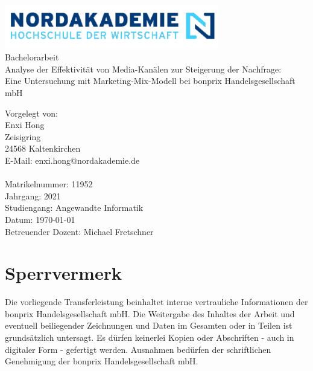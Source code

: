 \documentclass{common/nak}
\numberwithin{equation}{subsection}
\begin{document}
\hspace{3cm}
\begin{center}
    \includegraphics[width=0.7\textwidth]{images/nak_logo2.png}\\
     \huge { Bachelorarbeit \\[1em]
     \large{Analyse der Effektivität von Media-Kanälen zur Steigerung der Nachfrage:
     \\ Eine Untersuchung mit Marketing-Mix-Modell bei bonprix Handelsgesellschaft mbH
}}
\end{center}

\vspace*{\fill}


\noindent Vorgelegt von:\\
Enxi Hong \\
Zeisigring \\
24568 Kaltenkirchen\\
E-Mail: enxi.hong@nordakademie.de\\
\\
Matrikelnummer: 11952\\
Jahrgang: 2021\\
Studiengang: Angewandte Informatik\\
Datum: \today\\
Betreuender Dozent: Michael Fretschner\\

\newpage

\newpage
\section*{Sperrvermerk}

Die vorliegende Transferleistung beinhaltet interne vertrauliche Informationen der bonprix Handelsgesellschaft mbH. Die Weitergabe des Inhaltes der Arbeit und eventuell beiliegender Zeichnungen und Daten im Gesamten oder in Teilen ist grundsätzlich untersagt. Es dürfen keinerlei Kopien oder Abschriften - auch in digitaler Form - gefertigt werden. Ausnahmen bedürfen der schriftlichen Genehmigung der bonprix Handelsgesellschaft mbH.
\end{document}

